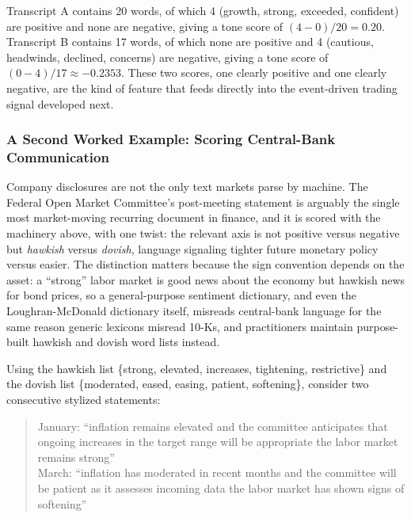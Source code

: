 \documentclass[../ai_in_finance]{subfiles}
\begin{document}
Transcript A contains 20 words, of which 4 (growth, strong, exceeded, confident) are positive and none are negative, giving a tone score of $(4-0)/20 = 0.20$. Transcript B contains 17 words, of which none are positive and 4 (cautious, headwinds, declined, concerns) are negative, giving a tone score of $(0-4)/17 \approx -0.2353$. These two scores, one clearly positive and one clearly negative, are the kind of feature that feeds directly into the event-driven trading signal developed next.

\subsubsection*{A Second Worked Example: Scoring Central-Bank Communication}

Company disclosures are not the only text markets parse by machine. The Federal Open Market Committee's post-meeting statement is arguably the single most market-moving recurring document in finance, and it is scored with the machinery above, with one twist: the relevant axis is not positive versus negative but \emph{hawkish} versus \emph{dovish}, language signaling tighter future monetary policy versus easier. The distinction matters because the sign convention depends on the asset: a ``strong'' labor market is good news about the economy but hawkish news for bond prices, so a general-purpose sentiment dictionary, and even the Loughran-McDonald dictionary itself, misreads central-bank language for the same reason generic lexicons misread 10-Ks, and practitioners maintain purpose-built hawkish and dovish word lists instead.

Using the hawkish list \{strong, elevated, increases, tightening, restrictive\} and the dovish list \{moderated, eased, easing, patient, softening\}, consider two consecutive stylized statements:

\begin{quote}
\small
January: ``inflation remains elevated and the committee anticipates that ongoing increases in the target range will be appropriate the labor market remains strong''\\
March: ``inflation has moderated in recent months and the committee will be patient as it assesses incoming data the labor market has shown signs of softening''
\end{quote}
\end{document}
